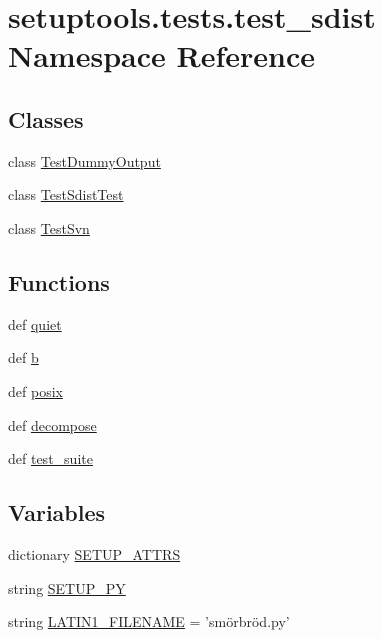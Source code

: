 \hypertarget{namespacesetuptools_1_1tests_1_1test__sdist}{}\section{setuptools.\+tests.\+test\+\_\+sdist Namespace Reference}
\label{namespacesetuptools_1_1tests_1_1test__sdist}
\subsection*{Classes}
\begin{DoxyCompactItemize}
\item 
class \hyperlink{classsetuptools_1_1tests_1_1test__sdist_1_1TestDummyOutput}{Test\+Dummy\+Output}
\item 
class \hyperlink{classsetuptools_1_1tests_1_1test__sdist_1_1TestSdistTest}{Test\+Sdist\+Test}
\item 
class \hyperlink{classsetuptools_1_1tests_1_1test__sdist_1_1TestSvn}{Test\+Svn}
\end{DoxyCompactItemize}
\subsection*{Functions}
\begin{DoxyCompactItemize}
\item 
def \hyperlink{namespacesetuptools_1_1tests_1_1test__sdist_af99575aedb328300f91c481cffa4fb65}{quiet}
\item 
def \hyperlink{namespacesetuptools_1_1tests_1_1test__sdist_a922b988d01b4eb547536cd2065a65601}{b}
\item 
def \hyperlink{namespacesetuptools_1_1tests_1_1test__sdist_aa14aa1752a083cc9874dd5f71715a78a}{posix}
\item 
def \hyperlink{namespacesetuptools_1_1tests_1_1test__sdist_af23129eeb6d7a54b9ed7271e3cf34020}{decompose}
\item 
def \hyperlink{namespacesetuptools_1_1tests_1_1test__sdist_a066a0b8b93d86fb2fd23c8321f7e5044}{test\+\_\+suite}
\end{DoxyCompactItemize}
\subsection*{Variables}
\begin{DoxyCompactItemize}
\item 
dictionary \hyperlink{namespacesetuptools_1_1tests_1_1test__sdist_acc8c40cef9902ee27ef329021dea7c83}{S\+E\+T\+U\+P\+\_\+\+A\+T\+T\+R\+S}
\item 
string \hyperlink{namespacesetuptools_1_1tests_1_1test__sdist_ad704f93eed1e4f3484d93dd41e231c9f}{S\+E\+T\+U\+P\+\_\+\+P\+Y}
\item 
string \hyperlink{namespacesetuptools_1_1tests_1_1test__sdist_a2b97dc1973d32e31ff43519528f65770}{L\+A\+T\+I\+N1\+\_\+\+F\+I\+L\+E\+N\+A\+M\+E} = 'smörbröd.\+py'
\end{DoxyCompactItemize}


